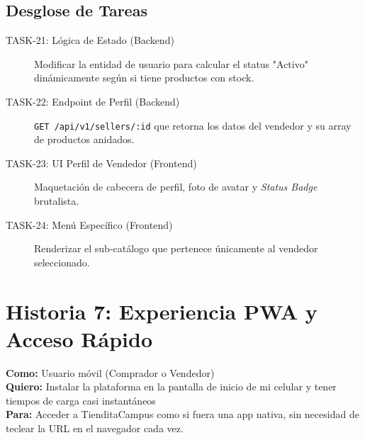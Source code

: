 \documentclass[11pt, letterpaper]{article}
\begin{document}
\begin{description}
    \subsection{Desglose de Tareas}
    \begin{description}
        \item[TASK-21: Lógica de Estado (Backend)] Modificar la entidad de usuario para calcular el status "Activo" dinámicamente según si tiene productos con stock.
        \item[TASK-22: Endpoint de Perfil (Backend)] \texttt{GET /api/v1/sellers/:id} que retorna los datos del vendedor y su array de productos anidados.
        \item[TASK-23: UI Perfil de Vendedor (Frontend)] Maquetación de cabecera de perfil, foto de avatar y \textit{Status Badge} brutalista.
        \item[TASK-24: Menú Específico (Frontend)] Renderizar el sub-catálogo que pertenece únicamente al vendedor seleccionado.
    \end{description}

    \newpage

    \section{Historia 7: Experiencia PWA y Acceso Rápido}
   
    \begin{tcolorbox}[colback=cyan!5!white,colframe=cyan!75!black,title=HU-07: Instalación como Aplicación Nativa]
        \textbf{Como:} Usuario móvil (Comprador o Vendedor) \\
        \textbf{Quiero:} Instalar la plataforma en la pantalla de inicio de mi celular y tener tiempos de carga casi instantáneos \\
        \textbf{Para:} Acceder a TienditaCampus como si fuera una app nativa, sin necesidad de teclear la URL en el navegador cada vez.
    \end{tcolorbox}
   

\end{description}
\end{document}
